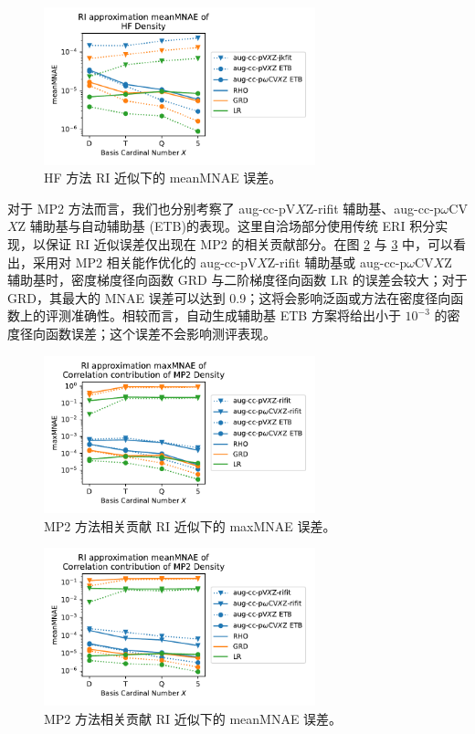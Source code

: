 \begin{figure}[h]
  \centering
  \caption{HF 方法 RI 近似下的 meanMNAE 误差。}
  \label{fig.HF-RI-mean}
  \includegraphics[width=0.7\textwidth]{assets/HF-RI-mean.pdf}
\end{figure}

对于 MP2 方法而言，我们也分别考察了 aug-cc-pV$X$Z-rifit 辅助基\cite{Weigend-Haettig.JCP.2002}、aug-cc-p$\omega$CV$X$Z 辅助基\cite{10.1039/b415208e}与自动辅助基 (ETB)\cite{Stoychev-Neese.JCTC.2017}的表现。这里自洽场部分使用传统 ERI 积分实现，以保证 RI 近似误差仅出现在 MP2 的相关贡献部分。在图 \ref{fig.MP2-RI-err} 与 \ref{fig.MP2-RI-mean} 中，可以看出，采用对 MP2 相关能作优化的 aug-cc-pV$X$Z-rifit 辅助基或 aug-cc-p$\omega$CV$X$Z 辅助基时，密度梯度径向函数 GRD 与二阶梯度径向函数 LR 的误差会较大；对于 GRD，其最大的 MNAE 误差可以达到 0.9；这将会影响泛函或方法在密度径向函数上的评测准确性。相较而言，自动生成辅助基 ETB 方案将给出小于 $10^{-3}$ 的密度径向函数误差；这个误差不会影响测评表现。

\begin{figure}[h]
  \centering
  \caption{MP2 方法相关贡献 RI 近似下的 maxMNAE 误差。}
  \label{fig.MP2-RI-err}
  \includegraphics[width=0.7\textwidth]{assets/MP2-RI-err.pdf}
\end{figure}

\begin{figure}[h]
  \centering
  \caption{MP2 方法相关贡献 RI 近似下的 meanMNAE 误差。}
  \label{fig.MP2-RI-mean}
  \includegraphics[width=0.7\textwidth]{assets/MP2-RI-mean.pdf}
\end{figure}


